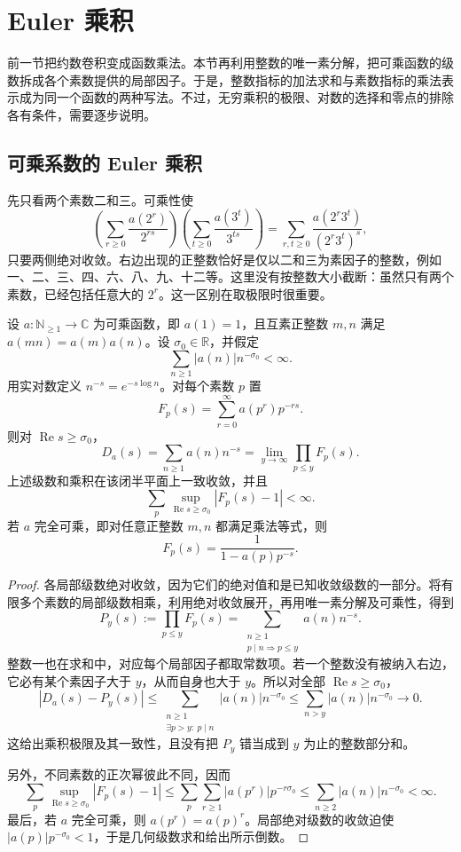 \section{Euler 乘积}
\label{b3:sec:2505}

前一节把约数卷积变成函数乘法。本节再利用整数的唯一素分解，把可乘函数的级数拆成各个素数提供的局部因子。于是，整数指标的加法求和与素数指标的乘法表示成为同一个函数的两种写法。不过，无穷乘积的极限、对数的选择和零点的排除各有条件，需要逐步说明。

\subsection{可乘系数的 Euler 乘积}
\label{b3:subsec:250501}

先只看两个素数二和三。可乘性使
\[
 \left(\sum_{r\ge0}\frac{a(2^r)}{2^{rs}}\right)
 \left(\sum_{t\ge0}\frac{a(3^t)}{3^{ts}}\right)
 =\sum_{r,t\ge0}\frac{a(2^r3^t)}{(2^r3^t)^s},
\]
只要两侧绝对收敛。右边出现的正整数恰好是仅以二和三为素因子的整数，例如一、二、三、四、六、八、九、十二等。这里没有按整数大小截断：虽然只有两个素数，已经包括任意大的 \(2^r\)。这一区别在取极限时很重要。

\begin{theorem}[Euler 乘积]\label{b3:thm:25-euler-product}
设 \(a:\mathbb N_{\ge1}\to\mathbb C\) 为可乘函数，即 \(a(1)=1\)，且互素正整数 \(m,n\) 满足 \(a(mn)=a(m)a(n)\)。设 \(\sigma_0\in\mathbb R\)，并假定
\[
 \sum_{n\ge1}|a(n)|n^{-\sigma_0}<\infty.
\]
用实对数定义 \(n^{-s}=e^{-s\log n}\)。对每个素数 \(p\) 置
\[
 F_p(s)=\sum_{r=0}^{\infty}a(p^r)p^{-rs}.
\]
则对 \(\operatorname{Re}s\ge\sigma_0\)，
\begin{equation}\label{b3:eq:25-euler-product}
 D_a(s)=\sum_{n\ge1}a(n)n^{-s}
       =\lim_{y\to\infty}\prod_{p\le y}F_p(s).
\end{equation}
上述级数和乘积在该闭半平面上一致收敛，并且
\[
 \sum_p\sup_{\operatorname{Re}s\ge\sigma_0}|F_p(s)-1|<\infty.
\]
若 \(a\) 完全可乘，即对任意正整数 \(m,n\) 都满足乘法等式，则
\[
 F_p(s)=\frac1{1-a(p)p^{-s}}.
\]
\end{theorem}
\begin{proof}
各局部级数绝对收敛，因为它们的绝对值和是已知收敛级数的一部分。将有限多个素数的局部级数相乘，利用绝对收敛展开，再用唯一素分解及可乘性，得到
\[
 P_y(s):=\prod_{p\le y}F_p(s)
 =\sum_{\substack{n\ge1\\p\mid n\Rightarrow p\le y}}a(n)n^{-s}.
\]
整数一也在求和中，对应每个局部因子都取常数项。若一个整数没有被纳入右边，它必有某个素因子大于 \(y\)，从而自身也大于 \(y\)。所以对全部 \(\operatorname{Re}s\ge\sigma_0\)，
\[
 |D_a(s)-P_y(s)|
 \le\sum_{\substack{n\ge1\\\exists p>y:\ p\mid n}}|a(n)|n^{-\sigma_0}
 \le\sum_{n>y}|a(n)|n^{-\sigma_0}\longrightarrow0.
\]
这给出乘积极限及其一致性，且没有把 \(P_y\) 错当成到 \(y\) 为止的整数部分和。

另外，不同素数的正次幂彼此不同，因而
\[
 \sum_p\sup_{\operatorname{Re}s\ge\sigma_0}|F_p(s)-1|
 \le\sum_p\sum_{r\ge1}|a(p^r)|p^{-r\sigma_0}
 \le\sum_{n\ge2}|a(n)|n^{-\sigma_0}<\infty.
\]
最后，若 \(a\) 完全可乘，则 \(a(p^r)=a(p)^r\)。局部绝对级数的收敛迫使 \(|a(p)|p^{-\sigma_0}<1\)，于是几何级数求和给出所示倒数。
\end{proof}

